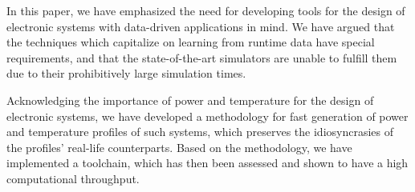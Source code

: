 In this paper, we have emphasized the need for developing tools for the design
of electronic systems with data-driven applications in mind. We have argued that
the techniques which capitalize on learning from runtime data have special
requirements, and that the state-of-the-art simulators are unable to fulfill
them due to their prohibitively large simulation times.

Acknowledging the importance of power and temperature for the design of
electronic systems, we have developed a methodology for fast generation of power
and temperature profiles of such systems, which preserves the idiosyncrasies of
the profiles' real-life counterparts. Based on the methodology, we have
implemented a toolchain, which has then been assessed and shown to have a high
computational throughput.
